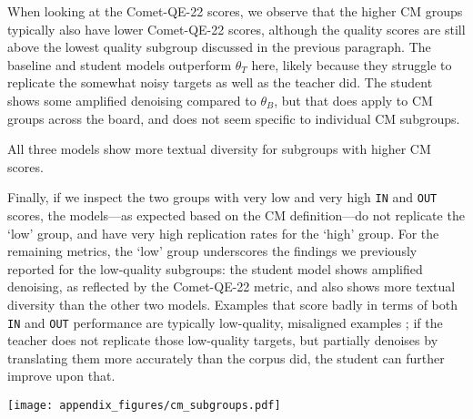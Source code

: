 When looking at the Comet-QE-22 scores, we observe that the higher CM groups typically also have lower Comet-QE-22 scores, although the quality scores are still above the lowest quality subgroup discussed in the previous paragraph.
The baseline and student models outperform $\theta_T$ here, likely because they struggle to replicate the somewhat noisy targets as well as the teacher did. The student shows some amplified denoising compared to $\theta_B$, but that does apply to CM groups across the board, and does not seem specific to individual CM subgroups.

All three models show more textual diversity for subgroups with higher CM scores.

Finally, if we inspect the two groups with very low and very high \texttt{IN} and \texttt{OUT} scores, the models---as expected based on the CM definition---do not replicate the `low' group, and have very high replication rates for the `high' group. For the remaining metrics, the `low' group underscores the findings we previously reported for the low-quality subgroups: the student model shows amplified denoising, as reflected by the Comet-QE-22 metric, and also shows more textual diversity than the other two models.
Examples that score badly in terms of both \texttt{IN} and \texttt{OUT} performance are typically low-quality, misaligned examples \citep{dankers2023memorisation}; if the teacher does not replicate those low-quality targets, but partially denoises by translating them more accurately than the corpus did, the student can further improve upon that.

\noindent\begin{minipage}{\textwidth}
    \texttt{[image: appendix\_figures/cm\_subgroups.pdf]}
    \label{fig:cm_subgroups}
\end{minipage}
\vspace{0.05cm}

